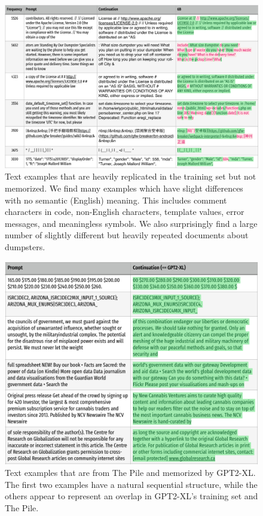\begin{figure}
    \centering
    \includegraphics[width=0.7\linewidth]{figures/text-egs/style2-rep-but-not-mem_pg1.pdf}
    \caption{Text examples that are heavily replicated in the training set but not memorized. We find many examples which have slight differences with no semantic (English) meaning. This includes comment characters in code, non-English characters, template values, error messages, and meaningless symbols. We also surprisingly find a large number of slightly different but heavily repeated documents about dumpsters.}
    \label{fig:egs-rep-but-not-mem}
\end{figure}

\begin{figure}
    \centering
    \includegraphics[width=0.7\linewidth]{figures/text-egs/style2-mem-by-GPT2_pg1.pdf}
    \caption{Text examples that are from The Pile and memorized by GPT2-XL. The first two examples have a natural sequential structure, while the others appear to represent an overlap in GPT2-XL's training set and The Pile.}
    \label{fig:egs-mem-by-gpt2}
\end{figure}


